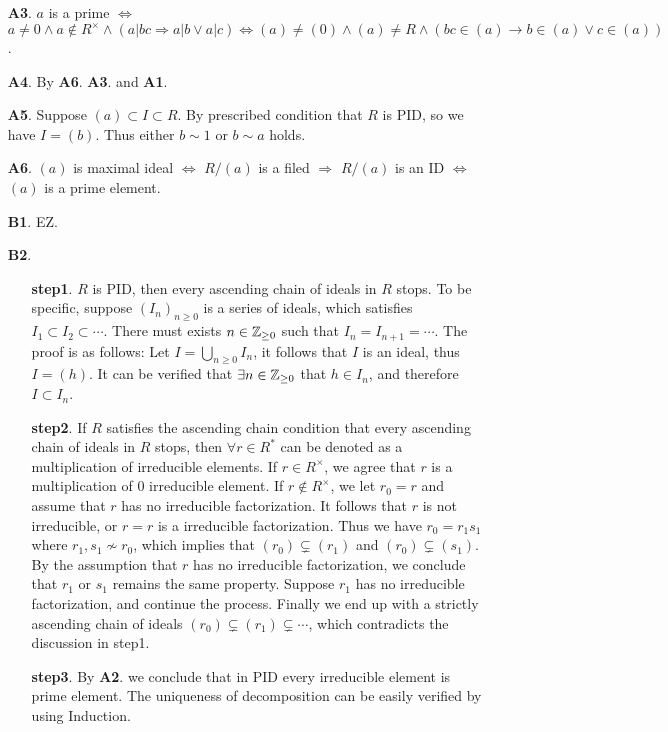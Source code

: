 \begin{enumerate}
    \item[\textbf{A3}.] $a$ is a prime $\Leftrightarrow$ $a \neq 0 \land a \notin R^{\times} \land (a|bc \Rightarrow a|b \lor a|c ) \Leftrightarrow (a) \neq (0) \land (a) \neq R \land (bc \in (a) \rightarrow b \in (a) \lor c \in (a))$.
    \item[\textbf{A4}.] By \textbf{A6}. \textbf{A3}. and \textbf{A1}.
    \item[\textbf{A5}.] Suppose $(a) \subset I \subset R$. By prescribed condition that $R$ is PID, so we have $I = (b)$. Thus either $b \sim 1$ or $b \sim a$ holds.
    \item[\textbf{A6}.] $(a)$ is maximal ideal $\Leftrightarrow$ $R/(a)$ is a filed $\Rightarrow$ $R/(a)$ is an ID $\Leftrightarrow$ $(a)$ is a prime element. 
    

    \item[\textbf{B1}.] EZ.
    \item[\textbf{B2}.]
    \begin{enumerate}
        \item[\textbf{step1}.] $R$ is PID, then every ascending chain of ideals in $R$ stops. To be specific, suppose $(I_n)_{n \geq 0}$ is a series of ideals, which satisfies $I_1 \subset I_2 \subset \cdots$. There must exists $n \in \mathbb Z_{\geq 0}$ such that $I_n = I_{n+1} = \cdots$. The proof is as follows: Let $I = \bigcup_{n \geq 0} I_n$, it follows that $I$ is an ideal, thus $I = (h)$. It can be verified that $\exists n \in \mathbb Z_{\geq 0}$ that $h \in I_n$, and therefore $I \subset I_n$.
        \item[\textbf{step2}.] If $R$ satisfies the ascending chain condition that every ascending chain of ideals in $R$ stops, then $\forall r \in R^*$ can be denoted as a multiplication of irreducible elements. If $r \in R^{\times}$, we agree that $r$ is a multiplication of 0 irreducible element. If $r \notin R^{\times}$, we let $r_0 = r$ and assume that $r$ has no irreducible factorization. It follows that $r$ is not irreducible, or $r = r$ is a irreducible factorization. Thus we have $r_0 = r_1 s_1$ where $r_1, s_1 \nsim r_0$, which implies that $(r_0) \subsetneq (r_1)$ and $(r_0) \subsetneq (s_1)$. By the assumption that $r$ has no irreducible factorization, we conclude that $r_1$ or $s_1$ remains the same property. Suppose $r_1$ has no irreducible factorization, and continue the process. Finally we end up with a strictly ascending chain of ideals $(r_0) \subsetneq (r_1) \subsetneq \cdots $, which contradicts the discussion in step1.
        \item[\textbf{step3}.] By \textbf{A2}. we conclude that in PID every irreducible element is prime element. The uniqueness of decomposition can be easily verified by using Induction.
    \end{enumerate}


\end{enumerate}
